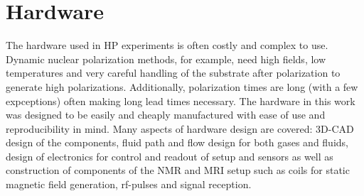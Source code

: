 \section{Hardware}
The hardware used in HP experiments is often costly and complex to use. Dynamic nuclear polarization methods, for example, need high fields, low temperatures and very careful handling of the substrate after polarization to generate high polarizations. Additionally, polarization times are long (with a few expceptions) often making long lead times necessary. The hardware in this work was designed to be easily and cheaply manufactured with ease of use and reproducibility in mind. Many aspects of hardware design are covered: 3D-CAD design of the components, fluid path and flow design for both gases and fluids, design of electronics for control and readout of setup and sensors as well as construction of components of the NMR and MRI setup such as coils for static magnetic field generation, rf-pulses and signal reception.
